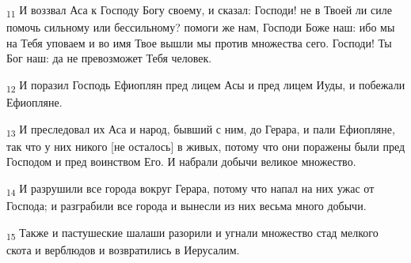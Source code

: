 \begin{tcolorbox}
\textsubscript{11} И воззвал Аса к Господу Богу своему, и сказал: Господи! не в Твоей ли силе помочь сильному или бессильному? помоги же нам, Господи Боже наш: ибо мы на Тебя уповаем и во имя Твое вышли мы против множества сего. Господи! Ты Бог наш: да не превозможет Тебя человек.
\end{tcolorbox}
\begin{tcolorbox}
\textsubscript{12} И поразил Господь Ефиоплян пред лицем Асы и пред лицем Иуды, и побежали Ефиопляне.
\end{tcolorbox}
\begin{tcolorbox}
\textsubscript{13} И преследовал их Аса и народ, бывший с ним, до Герара, и пали Ефиопляне, так что у них никого [не осталось] в живых, потому что они поражены были пред Господом и пред воинством Его. И набрали добычи великое множество.
\end{tcolorbox}
\begin{tcolorbox}
\textsubscript{14} И разрушили все города вокруг Герара, потому что напал на них ужас от Господа; и разграбили все города и вынесли из них весьма много добычи.
\end{tcolorbox}
\begin{tcolorbox}
\textsubscript{15} Также и пастушеские шалаши разорили и угнали множество стад мелкого скота и верблюдов и возвратились в Иерусалим.
\end{tcolorbox}
